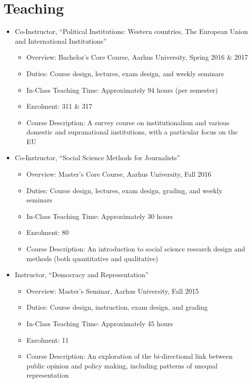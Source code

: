 \documentclass[letterpaper,fontsize=10pt]{scrartcl}
\begin{document}
	\section{Teaching}
	\vspace{-.5em}
	\begin{itemize}[noitemsep]
			\item Co-Instructor, “Political Institutions: Western countries, The European Union and International Institutions”
			\begin{itemize}[noitemsep]
					\item Overview: Bachelor’s Core Course, Aarhus University, Spring 2016 \& 2017
					\item Duties: Course design, lectures, exam design, and weekly seminars
          \item In-Class Teaching Time: Approximately 94 hours (per semester)
          \item Enrolment: 311 \& 317
					\item Course Description: A survey course on institutionalism and various domestic and supranational institutions, with a particular focus on the EU
			\end{itemize}
			\item Co-Instructor, “Social Science Methods for Journalists”
			\begin{itemize}[noitemsep]
					\item Overview: Master’s Core Course, Aarhus University, Fall 2016
					\item Duties: Course design, lectures, exam design, grading, and weekly seminars
          \item In-Class Teaching Time: Approximately 30 hours
					\item Enrolment: 80
					\item Course Description: An introduction to social science research design and methods (both quantitative and qualitative)
			\end{itemize}
			\item Instructor, “Democracy and Representation”
			\begin{itemize}[noitemsep]
					\item Overview: Master’s Seminar, Aarhus University, Fall 2015
					\item Duties: Course design, instruction, exam design, and grading
          \item In-Class Teaching Time: Approximately 45 hours
					\item Enrolment: 11
					\item Course Description: An exploration of the bi-directional link between public opinion and policy making, including patterns of unequal representation

\end{itemize}
\end{itemize}
\end{document}
